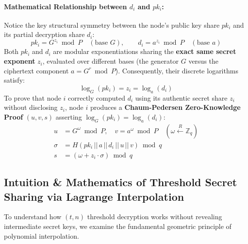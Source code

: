 \documentclass[11pt,a4paper]{article}
\begin{document}
\paragraph{Mathematical Relationship between $d_i$ and $pk_i$:}
Notice the key structural symmetry between the node's public key share $pk_i$ and its partial decryption share $d_i$:
\[
	pk_i = G^{z_i} \bmod P \quad (\text{base } G), \qquad d_i = a^{z_i} \bmod P \quad (\text{base } a)
\]
Both $pk_i$ and $d_i$ are modular exponentiations sharing the \textbf{exact same secret exponent} $z_i$, evaluated over different bases (the generator $G$ versus the ciphertext component $a = G^r \bmod P$). Consequently, their discrete logarithms satisfy:
\[
	\log_G(pk_i) = z_i = \log_a(d_i)
\]
To prove that node $i$ correctly computed $d_i$ using its authentic secret share $z_i$ without disclosing $z_i$, node $i$ produces a \textbf{Chaum-Pedersen Zero-Knowledge Proof} $(u, v, s)$ asserting $\log_G(pk_i) = \log_a(d_i)$:
\begin{align*}
	u      & = G^\omega \bmod P, \quad v = a^\omega \bmod P \quad (\omega \xleftarrow{R} \mathbb{Z}_q) \\
	\sigma & = H(pk_i \,||\, a \,||\, d_i \,||\, u \,||\, v) \bmod q                                   \\
	s      & = (\omega + z_i \cdot \sigma) \bmod q
\end{align*}

\subsection{Intuition \& Mathematics of Threshold Secret Sharing via Lagrange Interpolation}
\label{subsec:lagrange_intuition}

To understand how $(t, n)$ threshold decryption works without revealing intermediate secret keys, we examine the fundamental geometric principle of polynomial interpolation.
\end{document}
